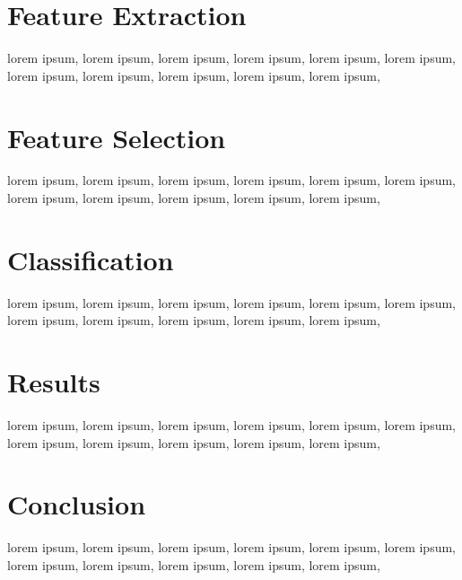 \documentclass[conference]{IEEEtran}
\begin{document}
\section{Feature Extraction}
lorem ipsum, lorem ipsum, lorem ipsum, lorem ipsum, lorem ipsum, lorem ipsum, lorem ipsum, lorem ipsum, lorem ipsum, lorem ipsum, lorem ipsum, 

\section{Feature Selection}
lorem ipsum, lorem ipsum, lorem ipsum, lorem ipsum, lorem ipsum, lorem ipsum, lorem ipsum, lorem ipsum, lorem ipsum, lorem ipsum, lorem ipsum, 

\section{Classification}
lorem ipsum, lorem ipsum, lorem ipsum, lorem ipsum, lorem ipsum, lorem ipsum, lorem ipsum, lorem ipsum, lorem ipsum, lorem ipsum, lorem ipsum, 


\section{Results}
lorem ipsum, lorem ipsum, lorem ipsum, lorem ipsum, lorem ipsum, lorem ipsum, lorem ipsum, lorem ipsum, lorem ipsum, lorem ipsum, lorem ipsum, 

\section{Conclusion}
lorem ipsum, lorem ipsum, lorem ipsum, lorem ipsum, lorem ipsum, lorem ipsum, lorem ipsum, lorem ipsum, lorem ipsum, lorem ipsum, lorem ipsum, 



\end{document}
